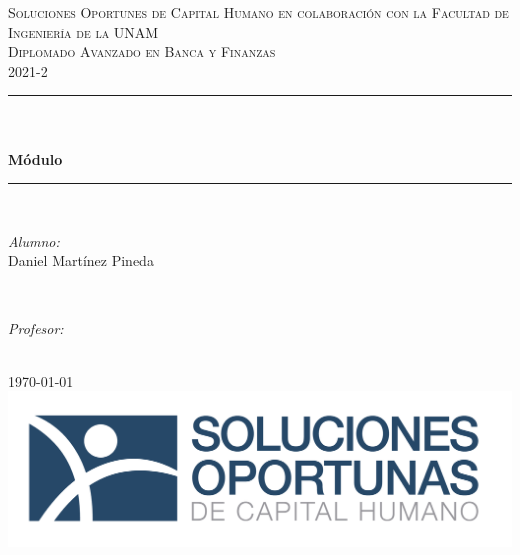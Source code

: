 \begin{titlepage}
    \newcommand{\HRule}{\rule{\linewidth}{0.3mm}} %

    \center %

    \textsc{Soluciones Oportunes de Capital Humano en colaboración con la Facultad de Ingeniería de la UNAM}\\[1cm]
    \textsc{\large Diplomado Avanzado en Banca y Finanzas}\\[0.5cm]
    \textsc{\large 2021-2}\\[0.5cm]
    
    \HRule \\[0.4cm]
        { \large \bfseries \nametarea\\[0.3cm]Módulo \modulo}\\[0.4cm] %
    \HRule \\[1.5cm]
    
    \begin{minipage}{0.4\textwidth}
        \begin{flushleft} 
            \emph{Alumno:}\\Daniel Martínez Pineda %
        \end{flushleft}
    \end{minipage}
    ~
    \begin{minipage}{0.4\textwidth}
        \begin{flushright} 
            \emph{Profesor:} \\\prof %
        \end{flushright}
    \end{minipage}\\[2cm]
    
    
    {\large \ifx\fentrega\undefined \today \else \fentrega \fi}\\[2cm] 

    \includegraphics[scale=0.35]{logo-soluciones.png} 
    \vfill %

\end{titlepage}